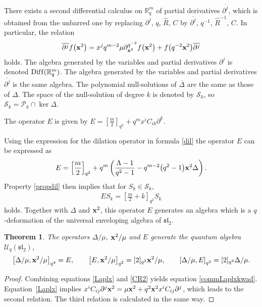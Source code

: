\documentclass[11pt]{article}
\newtheorem{theorem}{Theorem}
\newcommand{\mR}{\mathbb{R}}
\newcommand{\cP}{\mathcal{P}}
\newcommand{\cS}{\mathcal{S}}
\newcommand{\cU}{\mathcal{U}}
\numberwithin{equation}{section}
\begin{document}
There exists a second dif\/ferential calculus on $\mR^m_q$ of partial derivatives $\overline{\partial^j}$, which is obtained from the unbarred one by replacing $\partial^j$, $q$, $\hat{R}$, $C$ by $\overline{\partial^j}$, $q^{-1}$, $\hat{R}^{-1}$, $C$. In particular, the relation
\begin{gather}
\label{partialrbar}
\overline{\partial^j}f\big(\bold{x}^2\big) = x^jq^{m-2}\mu\partial_{\bold{x}^2}^{q^{-2}}f\big(\bold{x}^2\big)+f\big(q^{-2}\bold{x}^2\big)\overline{\partial^j}
\end{gather}
holds. The algebra generated by the variables and partial derivatives $\partial^j$ is denoted ${\rm Dif\/f}(\mR^m_q)$. The algebra generated by the variables and partial derivatives $\overline{\partial^j}$ is the same algebra. The polynomial null-solutions of $\overline{\Delta}$ are the same as those of $\Delta$. The space of the null-solution of degree $k$ is denoted by $\cS_k$, so $\cS_k=\cP_k\cap \ker \Delta$.


\begin{definition}
The operator $E$ is given by $E=[\frac{m}{2}]_{q^2}+q^mx^iC_{ik}\partial^k$.
\end{definition}

Using the expression for the dilation operator in formula \eqref{dil} the operator $E$ can be expressed as
\begin{gather*}
E= \left[\frac{m}{2}\right]_{q^2}+q^m\left(\frac{\Lambda-1}{q^2-1}-q^{m-2}\big(q^2-1\big)\bold{x}^2\Delta\right).
\end{gather*}
Property \eqref{propdil} then implies that for $S_k\in\cS_k$,
\begin{gather}
\label{Eharm}
ES_k = \left[\frac{m}{2}+k\right]_{q^2}S_k
\end{gather}
holds. Together with $\Delta$ and $\bold{x}^2$, this operator $E$ generates an algebra which is a $q$-deformation of the universal enveloping algebra of $\mathfrak{sl}_2$.
\begin{theorem}
\label{sl2}
The operators $\Delta/\mu$, $\bold{x}^2/\mu$ and $E$ generate the quantum algebra $\cU_q(\mathfrak{sl}_2)$,
\begin{gather}
\label{commLaplxkwad}
\left[\Delta/\mu,\bold{x}^2/\mu\right]_{q^4}=E,\qquad
\left[E,\bold{x}^2/\mu\right]_{q^2}=[2]_{q^2} \bold{x}^2/\mu,\qquad
\left[\Delta /\mu,E\right]_{q^2}=[2]_{q^2} \Delta/\mu.
\end{gather}
\end{theorem}

\begin{proof}\sloppy
Combining equations \eqref{Laplx} and \eqref{CR2} yields equation \eqref{commLaplxkwad}. Equation~\eqref{Laplx} implies $x^iC_{ij}\partial^j\bold{x}^2 =\mu \bold{x}^2+q^2\bold{x}^2x^iC_{ij}\partial^j$, which leads to the second relation. The third relation is calculated in the same way.
\end{proof}
\end{document}

